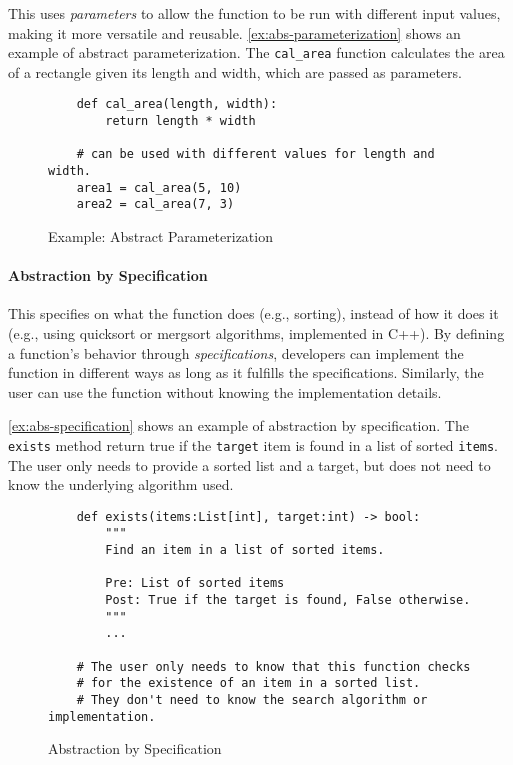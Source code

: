 \documentclass[oneside,11pt,dvipsnames]{book}
\newcommand{\code}[1]{\texttt{#1}}
\begin{document}
This uses \emph{parameters} to allow the function to be run with different input values, making it more versatile and reusable. \autoref{ex:abs-parameterization} shows an example of abstract parameterization. The \code{cal\_area} function calculates the area of a rectangle given its length and width, which are passed as parameters.

\begin{figure}[h]
    \begin{lstlisting}
    def cal_area(length, width):
        return length * width

    # can be used with different values for length and width.
    area1 = cal_area(5, 10)
    area2 = cal_area(7, 3)
\end{lstlisting}
\caption{Example: Abstract Parameterization}\label{ex:abs-parameterization}
\end{figure}



\paragraph{Abstraction by Specification} This specifies on what the function does (e.g., sorting), instead of how it does it (e.g., using quicksort or mergsort algorithms, implemented in C++). By defining a function's behavior through \emph{specifications}, developers can implement the function in different ways as long as it fulfills the specifications. Similarly, the user can use the function without knowing the implementation details.

\autoref{ex:abs-specification} shows an example of abstraction by specification. The \code{exists} method return true if the \code{target} item is found in a list of sorted \code{items}. The user only needs to provide a sorted list and a target, but does not need to know the underlying algorithm used.

\begin{figure}
\begin{lstlisting}
    def exists(items:List[int], target:int) -> bool:
        """
        Find an item in a list of sorted items.

        Pre: List of sorted items
        Post: True if the target is found, False otherwise.
        """
        ...

    # The user only needs to know that this function checks 
    # for the existence of an item in a sorted list. 
    # They don't need to know the search algorithm or implementation.
\end{lstlisting}
\caption{Abstraction by Specification}\label{ex:abs-specification}
\end{figure}
\end{document}
